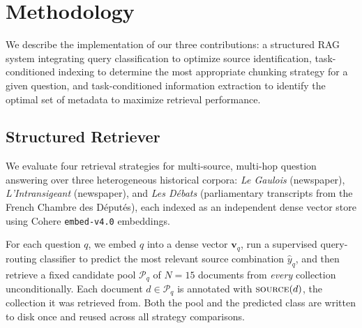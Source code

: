 %

\newcommand{\cmark}{\ding{51}}%
\newcommand{\xmark}{\ding{55}}%

\section{Methodology}
\label{sec:methodology}


We describe the implementation of our three contributions: a structured RAG system integrating query classification to optimize source identification, task-conditioned indexing to determine the most appropriate chunking strategy for a given question, and task-conditioned information extraction to identify the optimal set of metadata to maximize retrieval performance.


\subsection{Structured Retriever}
\label{sec:two-phase}

We evaluate four retrieval strategies for multi-source, multi-hop question answering
over three heterogeneous historical corpora: \textit{Le Gaulois} (newspaper),
\textit{L'Intransigeant} (newspaper), and \textit{Les Débats} (parliamentary
transcripts from the French Chambre des Députés), each indexed as an independent
dense vector store using Cohere \texttt{embed-v4.0} embeddings.

For each question $q$, we embed $q$ into a dense vector $\mathbf{v}_q$, run a
supervised query-routing classifier to predict the most relevant source combination
$\hat{y}_q$, and then retrieve a fixed candidate pool $\mathcal{P}_q$ of $N{=}15$
documents from \emph{every} collection unconditionally.
Each document $d \in \mathcal{P}_q$ is annotated with $\textsc{source}(d)$, the
collection it was retrieved from.
Both the pool and the predicted class are written to disk once and reused across all
strategy comparisons.




